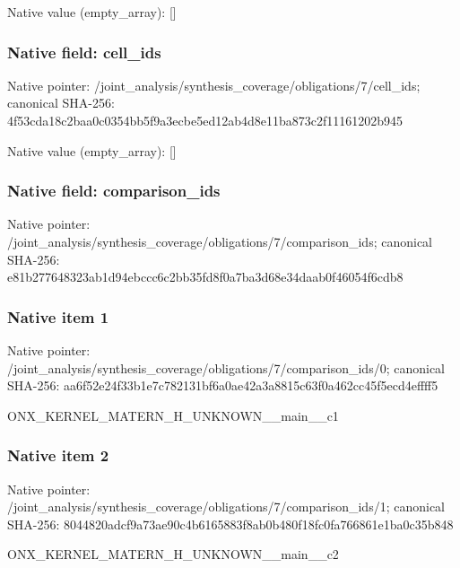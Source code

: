 \documentclass[10pt,a4paper]{article}
\begin{document}
Native value (empty\_\allowbreak{}array): []

\subsubsection{Native field: cell\_\allowbreak{}ids}
Native pointer: /joint\_\allowbreak{}analysis/synthesis\_\allowbreak{}coverage/obligations/7/cell\_\allowbreak{}ids; canonical SHA-256: 4f53cda18c2baa0c0354bb5f9a3ecbe5ed12ab4d8e11ba873c2f11161202b945

Native value (empty\_\allowbreak{}array): []

\subsubsection{Native field: comparison\_\allowbreak{}ids}
Native pointer: /joint\_\allowbreak{}analysis/synthesis\_\allowbreak{}coverage/obligations/7/comparison\_\allowbreak{}ids; canonical SHA-256: e81b277648323ab1d94ebccc6c2bb35fd8f0a7ba3d68e34daab0f46054f6cdb8

\subsubsection{Native item 1}
Native pointer: /joint\_\allowbreak{}analysis/synthesis\_\allowbreak{}coverage/obligations/7/comparison\_\allowbreak{}ids/0; canonical SHA-256: aa6f52e24f33b1e7c782131bf6a0ae42a3a8815c63f0a462cc45f5ecd4effff5

\begingroup\raggedright\sloppy ONX\_\allowbreak{}KERNEL\_\allowbreak{}MATERN\_\allowbreak{}H\_\allowbreak{}UNKNOWN\_\allowbreak{}\_\allowbreak{}main\_\allowbreak{}\_\allowbreak{}c1\par\endgroup

\subsubsection{Native item 2}
Native pointer: /joint\_\allowbreak{}analysis/synthesis\_\allowbreak{}coverage/obligations/7/comparison\_\allowbreak{}ids/1; canonical SHA-256: 8044820adcf9a73ae90c4b6165883f8ab0b480f18fc0fa766861e1ba0c35b848

\begingroup\raggedright\sloppy ONX\_\allowbreak{}KERNEL\_\allowbreak{}MATERN\_\allowbreak{}H\_\allowbreak{}UNKNOWN\_\allowbreak{}\_\allowbreak{}main\_\allowbreak{}\_\allowbreak{}c2\par\endgroup
\end{document}
